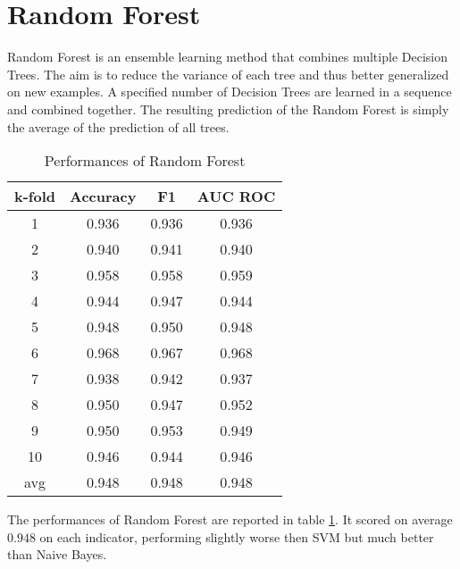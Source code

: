 \section{Random Forest}
\label{sec:random_forest}

Random Forest is an ensemble learning method that combines multiple Decision Trees.
The aim is to reduce the variance of each tree and thus better generalized on new examples.
A specified number of Decision Trees are learned in a sequence and combined together.
The resulting prediction of the Random Forest is simply the average of the prediction of all trees.

\begin{table}
	\centering
	\caption{Performances of Random Forest}
	\label{tab:random_forest}
	\begin{tabular}{cccc}
		\toprule
			\multicolumn{1}{c}{k-fold} &
			\multicolumn{1}{c}{Accuracy} &
			\multicolumn{1}{c}{F1} &
			\multicolumn{1}{c}{AUC ROC} \\
		\midrule
			  1  & 0.936 & 0.936 & 0.936 \\
			  2  & 0.940 & 0.941 & 0.940 \\
			  3  & 0.958 & 0.958 & 0.959 \\
			  4  & 0.944 & 0.947 & 0.944 \\
			  5  & 0.948 & 0.950 & 0.948 \\
			  6  & 0.968 & 0.967 & 0.968 \\
			  7  & 0.938 & 0.942 & 0.937 \\
			  8  & 0.950 & 0.947 & 0.952 \\
			  9  & 0.950 & 0.953 & 0.949 \\
			 10  & 0.946 & 0.944 & 0.946 \\[2pt]
			\hline
			 avg & 0.948 & 0.948 & 0.948 \Tstrut\Bstrut\\
		\bottomrule
	\end{tabular}
\end{table}

The performances of Random Forest are reported in table \cref{tab:random_forest}.
It scored on average $0.948$ on each indicator, performing slightly worse then \ac{SVM} but much better than Naive Bayes.
